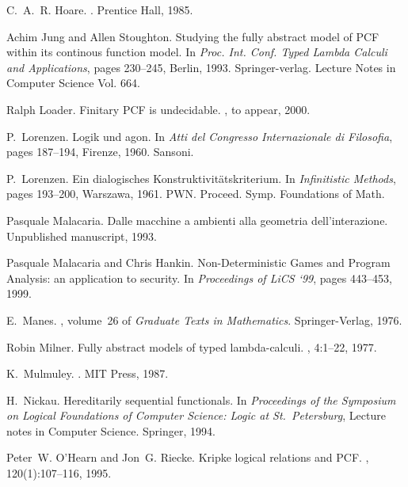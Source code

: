 \documentclass[11pt]{article}
\begin{document}
\begin{thebibliography}{Cur92b}
C.~A.~R. Hoare.
.
\newblock Prentice Hall, 1985.

Achim Jung and Allen Stoughton.
\newblock Studying the fully abstract model of {PCF} within its continous
  function model.
\newblock In {\em Proc. Int. Conf. Typed Lambda Calculi and Applications},
  pages 230--245, Berlin, 1993. Springer-verlag.
\newblock Lecture Notes in Computer Science Vol. 664.

Ralph Loader.
\newblock Finitary PCF is undecidable.
, to appear, 2000.

P.~Lorenzen.
\newblock Logik und agon.
\newblock In {\em Atti del Congresso Internazionale di Filosofia}, pages
  187--194, Firenze, 1960. Sansoni.

P.~Lorenzen.
\newblock Ein dialogisches {K}onstruktivit\"{a}tskriterium.
\newblock In {\em Infinitistic Methods}, pages 193--200, Warszawa, 1961. PWN.
\newblock Proceed. Symp. Foundations of Math.

Pasquale Malacaria.
\newblock Dalle macchine a ambienti alla geometria dell'interazione.
\newblock Unpublished manuscript, 1993.

Pasquale Malacaria and Chris Hankin.
Non-Deterministic Games and Program Analysis: an application to security.
In {\em Proceedings of LiCS `99}, pages 443--453, 1999.

E.~Manes.
, volume~26 of {\em Graduate Texts in
  Mathematics}.
\newblock Springer-Verlag, 1976.

Robin Milner.
\newblock Fully abstract models of typed lambda-calculi.
, 4:1--22, 1977.

K.~Mulmuley.
.
\newblock MIT Press, 1987.

H.~Nickau.
\newblock Hereditarily sequential functionals.
\newblock In {\em Proceedings of the Symposium on Logical Foundations of
  Computer Science: Logic at St.\ Petersburg}, Lecture notes in Computer
  Science. Springer, 1994.

Peter~W. O'Hearn and Jon~G. Riecke.
\newblock Kripke logical relations and {PCF}.
, 120(1):107--116, 1995.


\end{thebibliography}
\end{document}
